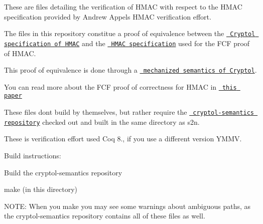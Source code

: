 These are files detailing the verification of HMAC with respect to the HMAC specification provided by Andrew Appel\textquotesingle{}s HMAC verification effort.

The files in this repository constitue a proof of equivalence between the \href{../../HMAC.cry}{\texttt{ Cryptol specification of HMAC}} and the \href{HMAC_spec.v}{\texttt{ HMAC specification}} used for the FCF proof of HMAC.

This proof of equivalence is done through a \href{https://github.com/GaloisInc/cryptol-semantics}{\texttt{ mechanized semantics of Cryptol}}.

You can read more about the FCF proof of correctness for HMAC in \href{https://www.cs.princeton.edu/~appel/papers/verified-hmac.pdf}{\texttt{ this paper}}

These files don\textquotesingle{}t build by themselves, but rather require the \href{https://github.com/GaloisInc/cryptol-semantics}{\texttt{ cryptol-\/semantics repository}} checked out and built in the same directory as s2n.

These is verification effort used Coq 8., if you use a different version YMMV.

Build instructions\+:
\begin{DoxyEnumerate}
\item Build the cryptol-\/semantics repository
\item make (in this directory)
\end{DoxyEnumerate}

NOTE\+: When you make you may see some warnings about ambiguous paths, as the cryptol-\/semantics repository contains all of these files as well. 